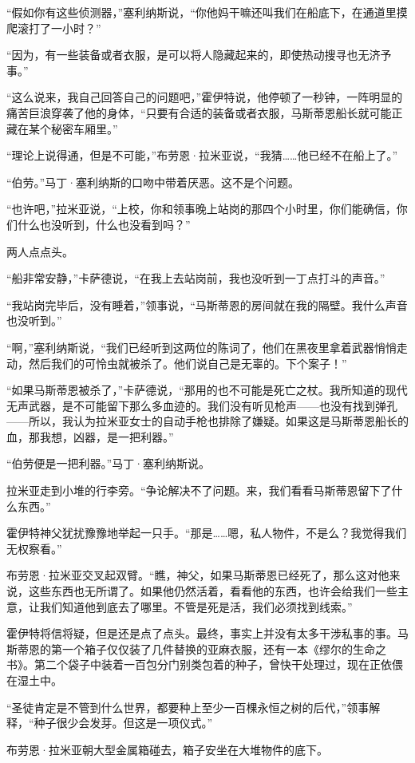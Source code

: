 \documentclass[AutoFakeBold=true]{book}
\begin{document}
``假如你有这些侦测器，''塞利纳斯说，``你他妈干嘛还叫我们在船底下，在通道里摸爬滚打了一小时？''

``因为，有一些装备或者衣服，是可以将人隐藏起来的，即使热动搜寻也无济予事。''

``这么说来，我自己回答自己的问题吧，''霍伊特说，他停顿了一秒钟，一阵明显的痛苦巨浪穿袭了他的身体，``只要有合适的装备或者衣服，马斯蒂恩船长就可能正藏在某个秘密车厢里。''

``理论上说得通，但是不可能，''布劳恩·拉米亚说，``我猜……他已经不在船上了。''

``伯劳。''马丁·塞利纳斯的口吻中带着厌恶。这不是个问题。

``也许吧，''拉米亚说，``上校，你和领事晚上站岗的那四个小时里，你们能确信，你们什么也没听到，什么也没看到吗？''

两人点点头。

``船非常安静，''卡萨德说，``在我上去站岗前，我也没听到一丁点打斗的声音。''

``我站岗完毕后，没有睡着，''领事说，``马斯蒂恩的房间就在我的隔壁。我什么声音也没听到。''

``啊，''塞利纳斯说，``我们已经听到这两位的陈词了，他们在黑夜里拿着武器悄悄走动，然后我们的可怜虫就被杀了。他们说自己是无辜的。下个案子！''

``如果马斯蒂恩被杀了，''卡萨德说，``那用的也不可能是死亡之杖。我所知道的现代无声武器，是不可能留下那么多血迹的。我们没有听见枪声——也没有找到弹孔——所以，我认为拉米亚女士的自动手枪也排除了嫌疑。如果这是马斯蒂恩船长的血，那我想，凶器，是一把利器。''

``伯劳便是一把利器。''马丁·塞利纳斯说。

拉米亚走到小堆的行李旁。``争论解决不了问题。来，我们看看马斯蒂恩留下了什么东西。''

霍伊特神父犹扰豫豫地举起一只手。``那是……嗯，私人物件，不是么？我觉得我们无权察看。''

布劳恩·拉米亚交叉起双臂。``瞧，神父，如果马斯蒂恩已经死了，那么这对他来说，这些东西也无所谓了。如果他仍然活着，看看他的东西，也许会给我们一些主意，让我们知道他到底去了哪里。不管是死是活，我们必须找到线索。''

霍伊特将信将疑，但是还是点了点头。最终，事实上并没有太多干涉私事的事。马斯蒂恩的第一个箱子仅仅装了几件替换的亚麻衣服，还有一本《缪尔的生命之书》。第二个袋子中装着一百包分门别类包着的种子，曾快干处理过，现在正依偎在湿土中。

``圣徒肯定是不管到什么世界，都要种上至少一百棵永恒之树的后代，''领事解释，``种子很少会发芽。但这是一项仪式。''

布劳恩·拉米亚朝大型金属箱碰去，箱子安坐在大堆物件的底下。
\end{document}
